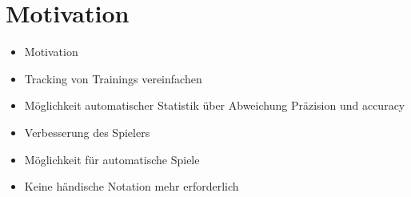 
\chapter{Motivation}
\label{chap:motivation}

\begin{itemize}
\item Motivation
\item Tracking von Trainings vereinfachen
\item Möglichkeit automatischer Statistik über Abweichung Präzision und accuracy
\item Verbesserung des Spielers
\item Möglichkeit für automatische Spiele
\item Keine händische Notation mehr erforderlich
\end{itemize}






